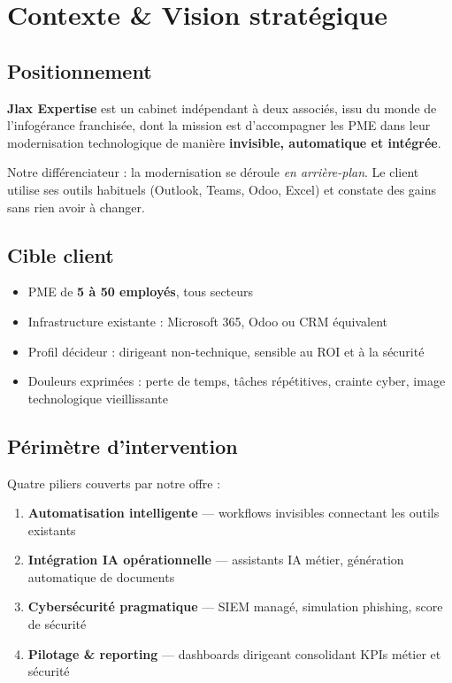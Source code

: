 \section{Contexte \& Vision stratégique}

\subsection{Positionnement}

\textbf{Jlax Expertise} est un cabinet indépendant à deux associés, issu du monde de l'infogérance franchisée, dont la mission est d'accompagner les PME dans leur modernisation technologique de manière \textbf{invisible, automatique et intégrée}.

\begin{pointcle}
  Notre différenciateur : la modernisation se déroule \emph{en arrière-plan}. Le client utilise ses outils habituels (Outlook, Teams, Odoo, Excel) et constate des gains sans rien avoir à changer.
\end{pointcle}

\subsection{Cible client}

\begin{itemize}
  \item PME de \textbf{5 à 50 employés}, tous secteurs
  \item Infrastructure existante : Microsoft 365, Odoo ou CRM équivalent
  \item Profil décideur : dirigeant non-technique, sensible au ROI et à la sécurité
  \item Douleurs exprimées : perte de temps, tâches répétitives, crainte cyber, image technologique vieillissante
\end{itemize}

\subsection{Périmètre d'intervention}

Quatre piliers couverts par notre offre :

\begin{enumerate}
  \item \textbf{Automatisation intelligente} — workflows invisibles connectant les outils existants
  \item \textbf{Intégration IA opérationnelle} — assistants IA métier, génération automatique de documents
  \item \textbf{Cybersécurité pragmatique} — SIEM managé, simulation phishing, score de sécurité
  \item \textbf{Pilotage \& reporting} — dashboards dirigeant consolidant KPIs métier et sécurité
\end{enumerate}

